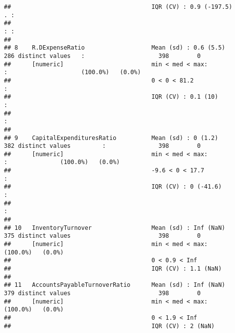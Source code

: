 \documentclass[
]{article}
\begin{document}
\begin{verbatim}
##                                        IQR (CV) : 0.9 (-197.5)                               . :                                 
##                                                                                              : :                                 
## 
## 8    R.DExpenseRatio                   Mean (sd) : 0.6 (5.5)     286 distinct values   :                     398        0        
##      [numeric]                         min < med < max:                                :                     (100.0%)   (0.0%)   
##                                        0 < 0 < 81.2                                    :                                         
##                                        IQR (CV) : 0.1 (10)                             :                                         
##                                                                                        :                                         
## 
## 9    CapitalExpendituresRatio          Mean (sd) : 0 (1.2)       382 distinct values         :               398        0        
##      [numeric]                         min < med < max:                                      :               (100.0%)   (0.0%)   
##                                        -9.6 < 0 < 17.7                                       :                                   
##                                        IQR (CV) : 0 (-41.6)                                  :                                   
##                                                                                              :                                   
## 
## 10   InventoryTurnover                 Mean (sd) : Inf (NaN)     375 distinct values                         398        0        
##      [numeric]                         min < med < max:                                                      (100.0%)   (0.0%)   
##                                        0 < 0.9 < Inf                                                                             
##                                        IQR (CV) : 1.1 (NaN)                                                                      
## 
## 11   AccountsPayableTurnoverRatio      Mean (sd) : Inf (NaN)     379 distinct values                         398        0        
##      [numeric]                         min < med < max:                                                      (100.0%)   (0.0%)   
##                                        0 < 1.9 < Inf                                                                             
##                                        IQR (CV) : 2 (NaN)                                                                        

\end{verbatim}
\end{document}
